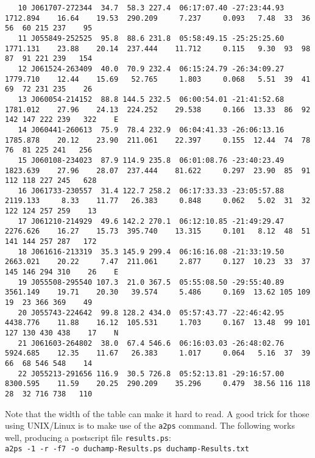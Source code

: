 {\begin{verbatim}
   10 J061707-272344  34.7  58.3 227.4  06:17:07.40 -27:23:44.93 1712.894    16.64    19.53  290.209     7.237     0.093   7.48  33  36  56  60 215 237    95     
   11 J055849-252525  95.8  88.6 231.8  05:58:49.15 -25:25:25.60 1771.131    23.88    20.14  237.444    11.712     0.115   9.30  93  98  87  91 221 239   154     
   12 J061524-263409  40.0  70.9 232.4  06:15:24.79 -26:34:09.27 1779.710    12.44    15.69   52.765     1.803     0.068   5.51  39  41  69  72 231 235    26     
   13 J060054-214152  88.8 144.5 232.5  06:00:54.01 -21:41:52.68 1781.012    27.96    24.13  224.252    29.538     0.166  13.33  86  92 142 147 222 239   322    E
   14 J060441-260613  75.9  78.4 232.9  06:04:41.33 -26:06:13.16 1785.878    20.12    23.90  211.061    22.397     0.155  12.44  74  78  76  81 225 241   256     
   15 J060108-234023  87.9 114.9 235.8  06:01:08.76 -23:40:23.49 1823.639    27.96    28.07  237.444    81.622     0.297  23.90  85  91 112 118 227 245   628     
   16 J061733-230557  31.4 122.7 258.2  06:17:33.33 -23:05:57.88 2119.133     8.33    11.77   26.383     0.848     0.062   5.02  31  32 122 124 257 259    13     
   17 J061210-214929  49.6 142.2 270.1  06:12:10.85 -21:49:29.47 2276.626    16.27    15.73  395.740    13.315     0.101   8.12  48  51 141 144 257 287   172     
   18 J061616-213319  35.3 145.9 299.4  06:16:16.08 -21:33:19.50 2663.021    20.22     7.47  211.061     2.877     0.127  10.23  33  37 145 146 294 310    26    E
   19 J055508-295540 107.3  21.0 367.5  05:55:08.50 -29:55:40.89 3561.149    19.71    20.30   39.574     5.486     0.169  13.62 105 109  19  23 366 369    49     
   20 J055743-224642  99.8 128.2 434.0  05:57:43.77 -22:46:42.95 4438.776    11.88    16.12  105.531     1.703     0.167  13.48  99 101 127 130 430 438    17    N
   21 J061603-264802  38.0  67.4 546.6  06:16:03.03 -26:48:02.76 5924.685    12.35    11.67   26.383     1.017     0.064   5.16  37  39  66  68 546 548    14     
   22 J055213-291656 116.9  30.5 726.8  05:52:13.81 -29:16:57.00 8300.595    11.59    20.25  290.209    35.296     0.479  38.56 116 118  28  32 716 738   110     
  \end{verbatim}
}
Note that the
width of the table can make it hard to read. A good trick for those
using UNIX/Linux is to make use of the \texttt{a2ps} command. The
following works well, producing a postscript file \texttt{results.ps}:
\\\verb|a2ps -1 -r -f7 -o duchamp-Results.ps duchamp-Results.txt|
